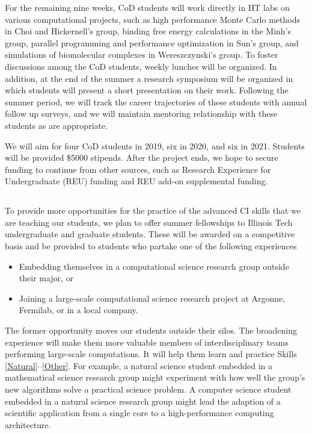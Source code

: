 \documentclass[11pt]{NSFamsart}
\begin{document}
For the remaining nine weeks, CoD students will work directly in IIT labs on various computational projects, such as high performance Monte Carlo methods in Choi and Hickernell's group, binding free energy calculations in the Minh's group, parallel programming and performance optimization in Sun's group, and simulations of biomolecular complexes in  Wereszczynski's group.  To foster discussions among the CoD students, weekly lunches will be organized.  In addition, at the end of the summer a research symposium will be organized in which students will present a short presentation on their work.  Following the summer period, we will track the career trajectories of these students with annual follow up surveys, and we will maintain mentoring relationship with these students as are appropriate. 

We will aim for four CoD students in 2019, six in 2020, and six in 2021.  Students will be provided \$5000 stipends.  After the project ends, we hope to secure funding to continue from other sources, such as Research Experience for Undergraduate (REU) funding and REU add-on supplemental funding.


\subsection{\FellowName} \label{Fellow}
To provide more opportunities for the practice of the advanced CI skills that we are teaching our students, we plan to offer summer fellowships to Illinois Tech undergraduate and graduate students.  These will be awarded on a competitive basis and be provided to students who partake one of the following experiences
\begin{itemize}
\item Embedding themselves in a computational science research group outside their major, or
\item Joining a large-scale computational science research project at Argonne, Fermilab, or in a local company.
\end{itemize}

The former opportunity moves our students outside their silos.  The broadening experience will make them more valuable members of interdisciplinary teams performing large-scale computations.  It will help them learn and practice Skills \ref{Natural}--\ref{Other}.  For example, a natural science student embedded in a mathematical science research group might experiment with how well the group's new algorithms solve a practical science problem.  A computer science student embedded in a natural science research group might lead the adaption of a scientific application from a single core to a high-performance computing architecture. 
\end{document}
